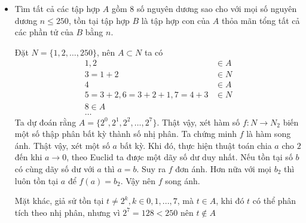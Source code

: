 \documentclass[11pt]{scrartcl}
\begin{document}
\begin{itemize}[label=, leftmargin=0em, itemsep=0.5em]
    \item \begin{bt}
        Tìm tất cả các tập hợp $A$ gồm 8 số nguyên dương sao cho với mọi số nguyên dương $n \leq 250$, tồn tại tập hợp $B$ là tập hợp con của $A$ thỏa mãn tổng tất cả các phần tử của $B$ bằng $n$.
    \end{bt}
    \begin{sol}
        Đặt $N = \{1,2,\dots,250\}$, nên $A \subset N$ ta có 
        \[
        \begin{aligned}
            1,2 &\in A\\
            3 = 1 + 2 &\in N\\
            4 &\in A\\
            5 = 3 + 2, 6 = 3 + 2 + 1, 7 = 4 + 3 &\in N\\
            8 \in A\\
            \dots
        \end{aligned}
        \]
        Ta dự đoán rằng $A = \{2^0,2^1,2^2,\dots,2^7\}$. Thật vậy, xét hàm số $f: N \to N_2$ biến một số thập phân bất kỳ thành số nhị phân. Ta chứng minh $f$ là hàm song ánh. Thật vậy, xét một số $a$ bất kỳ. Khi đó, thực hiện thuật toán chia $a$ cho $2$ đến khi $a \to 0$, theo Euclid ta được một dãy số dư duy nhất. Nếu tồn tại số $b$ có cùng dãy số dư với $a$ thì $a = b$. Suy ra $f$ đơn ánh. Hơn nữa với mọi $b_2$ thì luôn tồn tại $a$ để $f(a) = b_2$. Vậy nên $f$ song ánh.

        Mặt khác, giả sử tồn tại $t \neq 2^k, k \in 0,1,...,7$, mà $t \in A$, khi đó $t$ có thể phân tích theo nhị phân, nhưng vì $2^7 = 128 < 250$ nên $t \notin A$
         

\end{sol}
\end{itemize}
\end{document}
